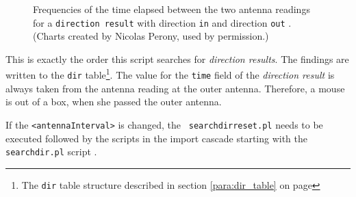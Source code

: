 \begin{figure}[htpb]%
	\centering 
	\qquad 
	\caption[Frequencies of the elapsed time between the antenna readings of direction results]{Frequencies of the time elapsed between the two antenna readings for a \lstinline|direction result| with direction \lstinline|in|  and direction \lstinline|out| . \footnotesize(Charts created by Nicolas Perony, used by permission.)} 
	 
\end{figure}


This is exactly the order this script searches for \textit{direction results}. The findings are written to the \lstinline|dir| table\footnote{The \lstinline|dir| table structure described in section \ref{para:dir_table} on page \pageref{para:dir_table}}. The value for the \lstinline|time| field of the \textit{direction result} is always taken from the antenna reading at the outer antenna. Therefore, a  mouse is out of a box, when she passed the outer antenna. 

If the \lstinline|<antennaInterval>| is changed, the \lstinline| searchdirreset.pl| needs to be executed followed by the scripts in the import cascade starting with the \lstinline|searchdir.pl| script \footnotemark[14].

